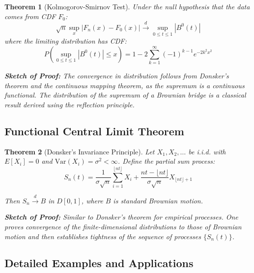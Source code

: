 \documentclass[12pt,a4paper]{article}
\newtheorem{theorem}{Theorem}[section]
\theoremstyle{remark}
\begin{document}
\begin{theorem}[Kolmogorov-Smirnov Test]
Under the null hypothesis that the data comes from CDF $F_0$:
$$\sqrt{n} \sup_{x} |F_n(x) - F_0(x)| \stackrel{d}{\to} \sup_{0 \leq t \leq 1} |B^0(t)|$$
where the limiting distribution has CDF:
$$P\left(\sup_{0 \leq t \leq 1} |B^0(t)| \leq x\right) = 1 - 2\sum_{k=1}^{\infty} (-1)^{k-1} e^{-2k^2x^2}$$

\textbf{Sketch of Proof:} The convergence in distribution follows from Donsker's theorem and the continuous mapping theorem, as the supremum is a continuous functional. The distribution of the supremum of a Brownian bridge is a classical result derived using the reflection principle.
\end{theorem}

\subsection{Functional Central Limit Theorem}

\begin{theorem}[Donsker's Invariance Principle]
Let $X_1, X_2, \ldots$ be i.i.d. with $E[X_i] = 0$ and $\text{Var}(X_i) = \sigma^2 < \infty$. Define the partial sum process:
$$S_n(t) = \frac{1}{\sigma\sqrt{n}} \sum_{i=1}^{\lfloor nt \rfloor} X_i + \frac{nt - \lfloor nt \rfloor}{\sigma\sqrt{n}} X_{\lfloor nt \rfloor + 1}$$

Then $S_n \stackrel{d}{\to} B$ in $D[0,1]$, where $B$ is standard Brownian motion.

\textbf{Sketch of Proof:} Similar to Donsker's theorem for empirical processes. One proves convergence of the finite-dimensional distributions to those of Brownian motion and then establishes tightness of the sequence of processes $\{S_n(t)\}$.
\end{theorem}

\subsection{Detailed Examples and Applications}
\end{document}
